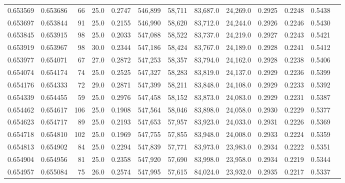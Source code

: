 \begin{tabular}{rrrrrrrrrrrrr}
0.653569 & 0.653686 &    66 & 25.0 &                                     0.2747 & 546,899 &  58,711 &  83,687.0 &  24,269.0 & 0.2925 & 0.2248 & 0.5438 \\
0.653697 & 0.653844 &    91 & 25.0 &                                     0.2155 & 546,990 &  58,620 &  83,712.0 &  24,244.0 & 0.2926 & 0.2246 & 0.5430 \\
0.653845 & 0.653915 &    98 & 25.0 &                                     0.2033 & 547,088 &  58,522 &  83,737.0 &  24,219.0 & 0.2927 & 0.2243 & 0.5421 \\
0.653919 & 0.653967 &    98 & 30.0 &                                     0.2344 & 547,186 &  58,424 &  83,767.0 &  24,189.0 & 0.2928 & 0.2241 & 0.5412 \\
0.653977 & 0.654071 &    67 & 27.0 &                                     0.2872 & 547,253 &  58,357 &  83,794.0 &  24,162.0 & 0.2928 & 0.2238 & 0.5406 \\
0.654074 & 0.654174 &    74 & 25.0 &                                     0.2525 & 547,327 &  58,283 &  83,819.0 &  24,137.0 & 0.2929 & 0.2236 & 0.5399 \\
0.654176 & 0.654333 &    72 & 29.0 &                                     0.2871 & 547,399 &  58,211 &  83,848.0 &  24,108.0 & 0.2929 & 0.2233 & 0.5392 \\
0.654339 & 0.654455 &    59 & 25.0 &                                     0.2976 & 547,458 &  58,152 &  83,873.0 &  24,083.0 & 0.2929 & 0.2231 & 0.5387 \\
0.654462 & 0.654617 &   106 & 25.0 &                                     0.1908 & 547,564 &  58,046 &  83,898.0 &  24,058.0 & 0.2930 & 0.2229 & 0.5377 \\
0.654623 & 0.654717 &    89 & 25.0 &                                     0.2193 & 547,653 &  57,957 &  83,923.0 &  24,033.0 & 0.2931 & 0.2226 & 0.5369 \\
0.654718 & 0.654810 &   102 & 25.0 &                                     0.1969 & 547,755 &  57,855 &  83,948.0 &  24,008.0 & 0.2933 & 0.2224 & 0.5359 \\
0.654813 & 0.654902 &    84 & 25.0 &                                     0.2294 & 547,839 &  57,771 &  83,973.0 &  23,983.0 & 0.2934 & 0.2222 & 0.5351 \\
0.654904 & 0.654956 &    81 & 25.0 &                                     0.2358 & 547,920 &  57,690 &  83,998.0 &  23,958.0 & 0.2934 & 0.2219 & 0.5344 \\
0.654957 & 0.655084 &    75 & 26.0 &                                     0.2574 & 547,995 &  57,615 &  84,024.0 &  23,932.0 & 0.2935 & 0.2217 & 0.5337 \\

\end{tabular}
